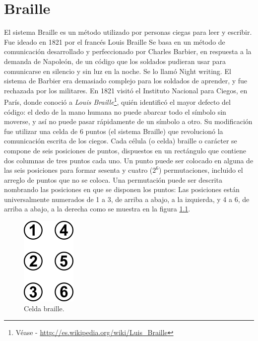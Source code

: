 \chapter{Braille}
%
El sistema Braille es un m\'etodo utilizado por personas ciegas para leer y 
escribir. Fue ideado en 1821 por el franc\'es Louis Braille
Se basa en un m\'etodo de comunicaci\'on desarrollado y perfeccionado por 
Charles Barbier, en respuesta a la demanda de Napole\'on, de un c\'odigo que
los soldados pudieran usar para comunicarse en silencio y sin luz en la noche.
Se lo llam\'o Night writing. El sistema de Barbier era demasiado complejo para
los soldados de aprender, y fue rechazada por los militares. En 1821 visit\'o
el Instituto Nacional para Ciegos, en Par\'is, donde conoci\'o a \emph{Louis
Braille}\footnote{V\'ease - \url{http://es.wikipedia.org/wiki/Luis_Braille}},
qui\'en identific\'o el mayor defecto del c\'odigo: el dedo de la mano humana
no puede abarcar todo el s\'imbolo sin moverse, y as\'i no puede pasar
r\'apidamente de un s\'imbolo a otro.
Su modificaci\'on fue utilizar una celda de 6 puntos (el sistema Braille) que 
revolucion\'o la comunicaci\'on escrita de los ciegos.
Cada c\'elula (o celda) braille o car\'acter se compone de seis posiciones de 
puntos, dispuestos en un rect\'angulo que contiene dos columnas de tres puntos
cada uno. Un punto puede ser colocado en alguna de las seis posiciones para
formar sesenta y cuatro ($2^{6}$) permutaciones, incluido el arreglo de puntos
que no se coloca. Una permutaci\'on puede ser descrita nombrando las posiciones
en que se disponen los puntos: Las posiciones est\'an universalmente numerados
de 1 a 3, de arriba a abajo, a la izquierda, y 4 a 6, de arriba a abajo, a la
derecha como se muestra en la figura \ref{fig:braille_cell}.


\begin{figure}
\centering
\includegraphics[scale=1]{./img/braille_cell.png}
\caption{Celda braille.}
\label{fig:braille_cell}
\end{figure}


